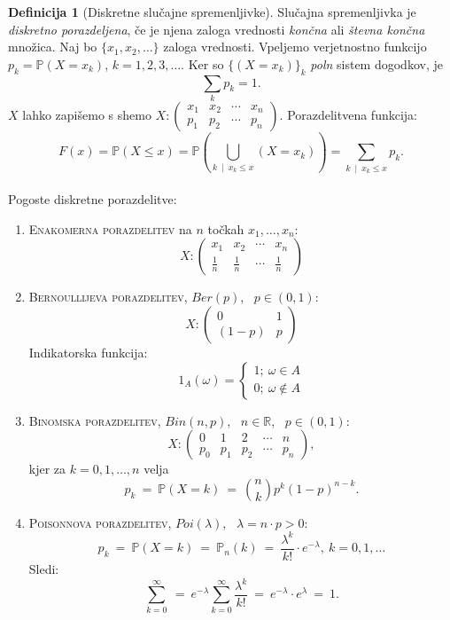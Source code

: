\documentclass[11pt]{article}
\theoremstyle{definition}
\newtheorem{definicija}{Definicija}[section]
\theoremstyle{definition}
\theoremstyle{definition}
\begin{document}
\begin{definicija}[Diskretne slučajne spremenljivke]

Slučajna spremenljivka je \textit{diskretno porazdeljena}, če je njena zaloga vrednosti \textit{končna} ali \textit{števna končna} množica. Naj bo $\{ x_1, x_2, \ldots \}$ zaloga vrednosti. Vpeljemo verjetnostno funkcijo $p_k = \mathbb{P}(X = x_k)$, $k = 1, 2, 3, \ldots.$ Ker so $\{ (X = x_k) \}_k$ \textit{poln} sistem dogodkov, je 
$$\sum_k p_k = 1.$$
$X$ lahko zapišemo s shemo 
$X: \begin{pmatrix}
	x_1 & x_2 & \cdots & x_n \\
	p_1 & p_2 & \cdots & p_n
\end{pmatrix}$. Porazdelitvena funkcija:
$$F(x) = \mathbb{P}(X \leq x) = \mathbb{P}\left( \bigcup_{k ~\mid~ x_k \leq x} (X = x_k) \right) = \sum_{k ~\mid~ x_k \leq x} p_k.$$ \\

\noindent Pogoste diskretne porazdelitve:
\begin{enumerate}
	\item \textsc{Enakomerna porazdelitev} na $n$ točkah $x_1, \ldots, x_n$:
	$$X: \begin{pmatrix}
		x_1 & x_2 & \cdots & x_n \\
		\frac{1}{n} & \frac{1}{n} & \cdots & \frac{1}{n}
	\end{pmatrix}$$
	
	\item \textsc{Bernoullijeva porazdelitev}, $Ber(p)$, ~$p \in (0, 1)$:
	$$X: \begin{pmatrix}
		0 & 1 \\
		(1-p) & p
	\end{pmatrix}$$
	Indikatorska funkcija:
	$$1_A(\omega) = \begin{cases}
	1 ; ~\omega \in A \\
	0 ; ~\omega \notin A
	\end{cases}$$
	
	\item \textsc{Binomska porazdelitev}, $Bin(n, p)$, ~$n \in \mathbb{R}$, ~$p \in (0, 1)$:
	$$X: \begin{pmatrix}
		0 & 1 & 2 & \cdots & n \\
		p_0 & p_1 & p_2 & \cdots & p_n
	\end{pmatrix},$$
	kjer za $k = 0, 1, \ldots, n$ velja
	$$p_k ~=~ \mathbb{P}(X = k) ~=~ \binom{n}{k} p^k (1 - p)^{n-k}.$$
	
	\item \textsc{Poisonnova porazdelitev}, $Poi(\lambda)$, ~$\lambda = n \cdot p > 0$:
	$$p_k ~=~ \mathbb{P}(X = k) ~=~ \mathbb{P}_n(k) ~=~ \frac{\lambda^k}{k!} \cdot e^{-\lambda}, ~k = 0, 1, \ldots$$
	Sledi:
	$$\sum_{k=0}^{\infty} ~=~ e^{-\lambda} \sum_{k=0}^{\infty} \frac{\lambda^k}{k!} ~=~ e^{-\lambda} \cdot e^{\lambda} ~=~ 1.$$
	

\end{enumerate}
\end{definicija}
\end{document}
